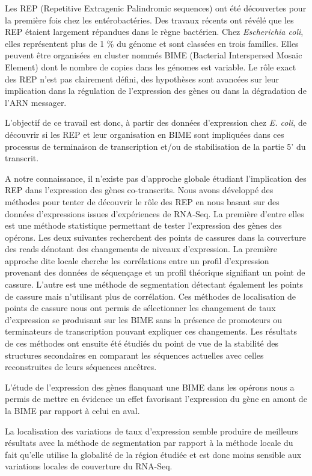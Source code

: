 \documentclass[12pt,a4paper]{report}
\begin{document}
Les REP (Repetitive Extragenic Palindromic sequences) ont été découvertes pour la première fois chez les entérobactéries. Des travaux récents ont révélé que les REP étaient largement répandues dans le règne bactérien. Chez \textit{Escherichia coli}, elles représentent plus de 1 \% du génome et sont classées en trois familles. Elles peuvent être organisées en cluster nommés BIME (Bacterial Interspersed Mosaic Element) dont le nombre de copies dans les génomes est variable. Le rôle exact des REP n’est pas clairement défini, des hypothèses sont avancées sur leur implication dans la régulation de l’expression des gènes  ou dans la dégradation de l'ARN messager.

L'objectif de ce travail est donc, à partir des données d'expression chez \textit{E. coli}, de découvrir si les REP et leur organisation en BIME sont impliquées dans ces processus de terminaison de transcription et/ou de stabilisation de la partie 5' du transcrit.

A notre connaissance, il n'existe pas d'approche globale étudiant l'implication des REP dans l'expression des gènes co-transcrits. Nous avons développé des méthodes pour tenter de découvrir le rôle des REP en nous basant sur des données d'expressions issues d'expériences de RNA-Seq. La première d'entre elles est une méthode statistique permettant de tester l'expression des gènes des opérons. Les deux suivantes recherchent des points de cassures dans la couverture des reads dénotant des changements de niveaux d'expression. La première approche dite locale cherche les corrélations entre un profil d'expression provenant des données de séquençage et un profil théorique signifiant un point de cassure. L'autre est une méthode de segmentation détectant également les points de cassure mais n'utilisant plus de corrélation. Ces méthodes de localisation de points de cassure nous ont permis de sélectionner les changement de taux d'expression se produisant sur les BIME sans la présence de promoteurs ou terminateurs de transcription pouvant expliquer ces changements. Les résultats de ces méthodes ont ensuite été étudiés du point de vue de la stabilité des structures secondaires en comparant les séquences actuelles avec celles reconstruites de leurs séquences ancêtres.

L'étude de l'expression des gènes flanquant une BIME dans les opérons nous a permis de mettre en évidence un effet favorisant l'expression du gène en amont de la BIME par rapport à celui en aval. 

La localisation des variations de taux d'expression semble produire de meilleurs résultats avec la méthode de segmentation par rapport à la méthode locale du fait qu'elle utilise la globalité de la région étudiée et est donc moins sensible aux variations locales de couverture du RNA-Seq. 
\end{document}
